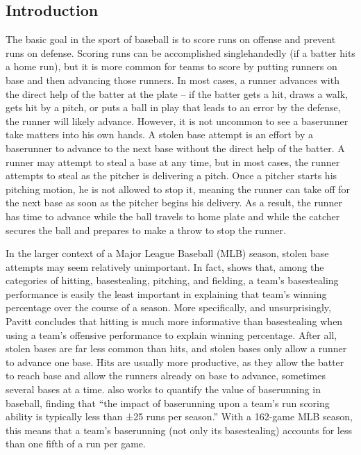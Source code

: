 \documentclass{article}
\begin{document}
\newpage
\tableofcontents


\newpage
\begin{center}
    \section{Introduction}
\end{center}
The basic goal in the sport of baseball is to score runs on offense and prevent runs on defense. Scoring runs can be accomplished singlehandedly (if a batter hits a home run), but it is more common for teams to score by putting runners on base and then advancing those runners. In most cases, a runner advances with the direct help of the batter at the plate – if the batter gets a hit, draws a walk, gets hit by a pitch, or puts a ball in play that leads to an error by the defense, the runner will likely advance. However, it is not uncommon to see a baserunner take matters into his own hands. A stolen base attempt is an effort by a baserunner to advance to the next base without the direct help of the batter. A runner may attempt to steal a base at any time, but in most cases, the runner attempts to steal as the pitcher is delivering a pitch. Once a pitcher starts his pitching motion, he is not allowed to stop it, meaning the runner can take off for the next base as soon as the pitcher begins his delivery. As a result, the runner has time to advance while the ball travels to home plate and while the catcher secures the ball and prepares to make a throw to stop the runner. 

In the larger context of a Major League Baseball (MLB) season, stolen base attempts may seem relatively unimportant. In fact, \cite{pavitt} shows that, among the categories of hitting, basestealing, pitching, and fielding, a team’s basestealing performance is easily the least important in explaining that team’s winning percentage over the course of a season. More specifically, and unsurprisingly, Pavitt concludes that hitting is much more informative than basestealing when using a team’s offensive performance to explain winning percentage. After all, stolen bases are far less common than hits, and stolen bases only allow a runner to advance one base. Hits are usually more productive, as they allow the batter to reach base and allow the runners already on base to advance, sometimes several bases at a time. \cite{baumer} also works to quantify the value of baserunning in baseball, finding that “the impact of baserunning upon a team’s run scoring ability is typically less than ±25 runs per season.” With a 162-game MLB season, this means that a team’s baserunning (not only its basestealing) accounts for less than one fifth of a run per game.
\end{document}
